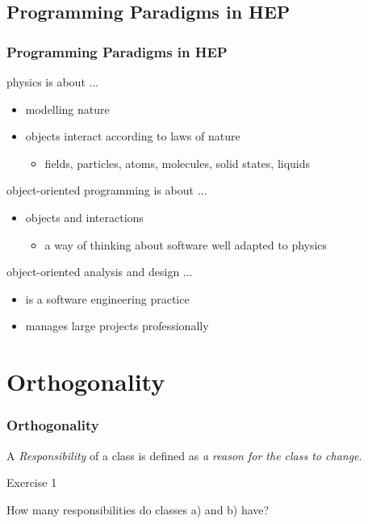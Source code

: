 \documentclass[9pt,dvips]{beamer}
\begin{document}
\subsection[OOP in HEP]{Programming Paradigms in HEP}
\begin{frame}
\frametitle{Programming Paradigms in HEP}
\normalsize
\begin{block}{physics is about ...}
  \begin{itemize}
  \item \alert<4->{modelling nature}
  \item objects interact according to laws of nature
    \begin{itemize}
    \item fields, particles, atoms, molecules, solid states, liquids
    \end{itemize}
  \end{itemize}
\end{block}
\vfill
\pause
\begin{block}{object-oriented programming is about ...}
  \begin{itemize}
  \item \alert<4->{objects and interactions}
    \begin{itemize}
    \item a way of thinking about software well adapted to
      physics
    \end{itemize}

  \end{itemize}
\end{block}
\vfill
\pause
\begin{block}{object-oriented analysis and design ...}
  \begin{itemize}
  \item is a software engineering practice
  \item \alert<4->{manages large projects professionally}
  \end{itemize}
\end{block}
\end{frame}

\section{Orthogonality}
\begin{frame}
  \frametitle{Orthogonality}
  \begin{definition}
    A \emph{Responsibility} of a class is defined as \emph{a reason for the class to change}.
  \end{definition}
  \vfill
  \begin{exampleblock}{Exercise 1}
    \begin{center}
      \Large
      How many responsibilities do classes a) and b) have?
    \end{center}

  \end{exampleblock}
  \vfill
\end{frame}
\end{document}
